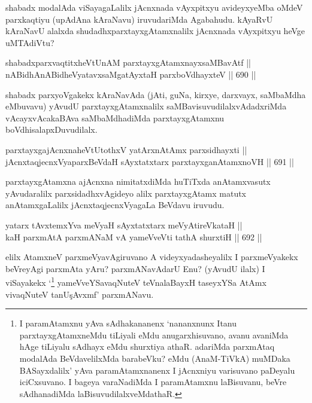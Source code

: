 \begin{artha} 
shabadx modalAda viSayagaLalilx jAcnxnada vAyxpitxyu avideyxyeMba oMdeV parxkaqtiyu (upAdAna kAraNavu) iruvudariMda Agabahudu. kAyaRvU kAraNavU alalxda shudadhxparxtayxgAtamxnalilx jAcnxnada vAyxpitxyu heVge uMTAdiVtu?
\end{artha}


\begin{shl}
shabadxparxvaqtitxheVtUnAM parxtayxgAtamxnayxsaMBavAtf || \\
nABidhAnABidheVyatavxsaMgatAyx\s taH parxboVdhayxteV \hfill || 690 ||  
\end{shl}

\begin{artha} 
shabadx parxyoVgakekx kAraNavAda (jAti, guNa, kirxye, darxvayx, saMbaMdha eMbuvavu) yAvudU parxtayxgAtamxnalilx saMBavisuvudilalxvAdadxriMda vAcayxvAcakaBAva saMbaMdhadiMda parxtayxgAtamxnu boVdhisalapxDuvudilalx.
\end{artha}


\begin{shl}
parxtayxgajAcnxnaheVtUtothxV yatArxnAtAmx parxsidhayxti || \\
jAcnxtaqjecnxVyaparxBeVdaH sAyxtatxtarx parxtayxganAtamxnoVH \hfill || 691 ||  
\end{shl}

\begin{artha} 
parxtayxgAtamxna ajAcnxna nimitatxdiMda huTiTxda anAtamxvasutx yAvudaralilx parxsidadhxvAgideyo alilx parxtayxgAtamx matutx anAtamxgaLalilx jAcnxtaqjecnxVyagaLa BeVdavu iruvudu.
\end{artha}


\begin{shl}
yatarx tAvxtemxYva meVyaH sAyxtatxtarx meVyAtireVkataH || \\
kaH parxmAtA parxmANaM vA yameVveVti tathA shurxtiH \hfill || 692 ||  
\end{shl}

\begin{artha} 
elilx AtamxneV parxmeVyavAgiruvano A videyxyadasheyalilx I parxmeVyakekx beVreyAgi parxmAta yAru? parxmANavAdarU Enu? (yAvudU ilalx) I viSayakekx `\footnote{I paramAtamxnu yAva sAdhakananenx `nananxnunx Itanu parxtayxgAtamxneMdu tiLiyali eMdu anugarxhisuvano, avanu avaniMda hAge tiLiyalu sAdhayx eMdu shurxtiya athaR. adariMda parxmAtaq modalAda BeVdavelilxMda barabeVku? eMdu (AnaM-TiVkA) muMDaka BASayxdalilx' yAva paramAtamxnanenx I jAcnxniyu varisuvano paDeyalu iciCxsuvano. I bageya varaNadiMda I paramAtamxnu laBisuvanu, beVre sAdhanadiMda laBisuvudilalxveMdathaR.} yameVveYSavaqNuteV teVnalaBayxH taseyxYSa AtAmx vivaqNuteV tanU\c sAvxmf' parxmANavu.
\end{artha}

